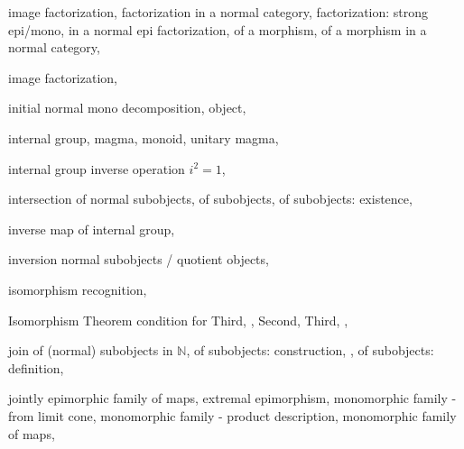\documentclass [12pt,oneside]{book}%
\theoremstyle{captionstyle}  %
\newcommand{\IdMap}{1}												%
\newcommand{\NNr}{\mathbb{N}}		%
\begin{document}
\begin{theindex}
    \indexspace

    \item image
    \subitem factorization, 
    \subitem factorization in a normal category, 
    \subitem factorization: strong epi/mono, 
    \subitem in a normal epi factorization, 
    \subitem of a morphism, 
    \subitem of a morphism in a normal category, 
    \item image factorization, 
    \item initial
    \subitem normal mono decomposition, 
    \subitem object, 
    \item internal
    \subitem group, 
    \subitem magma, 
    \subitem monoid, 
    \subitem unitary magma, 
    \item internal group
    \subitem inverse operation $i^2=\IdMap $, 
    \item intersection
    \subitem of normal subobjects, 
    \subitem of subobjects, 
    \subitem of subobjects: existence, 
    \item inverse map
    \subitem of internal group, 
    \item inversion
    \subitem normal subobjects / quotient objects, 
    \item isomorphism
    \subitem recognition, 
    \item Isomorphism Theorem
    \subitem condition for Third, , 
    \subitem Second, 
    \subitem Third, , 

    \indexspace

    \item join
    \subitem of (normal) subobjects in $\NNr $, 
    \subitem of subobjects: construction, ,
    \subitem of subobjects: definition, 
    \item jointly
    \subitem epimorphic family of maps, 
    \subitem extremal epimorphism, 
    \subitem monomorphic family - from limit cone, 
    \subitem monomorphic family - product description, 
    \subitem monomorphic family of maps, 

    \indexspace


\end{theindex}
\end{document}
